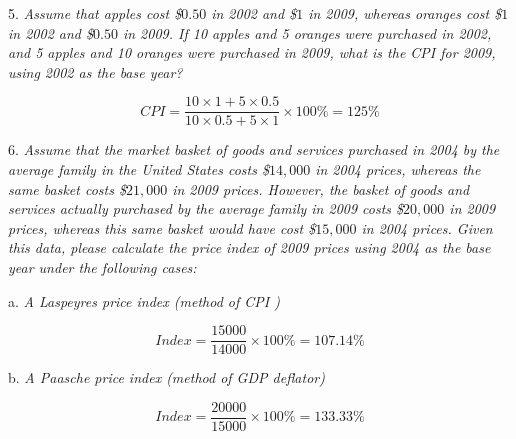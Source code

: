 \documentclass[10pt, a4paper]{article}
\begin{document}
    5. \emph{Assume that apples cost \$$0.50$ in 2002 and \$$1$ in 2009, whereas oranges cost \$$1$ in
    2002 and \$$0.50$ in 2009. If 10 apples and 5 oranges were purchased in 2002, and 5 apples and 10
    oranges were purchased in 2009, what is the CPI for 2009, using 2002 as the base year?}

    $$CPI = \frac{10 \times 1 + 5 \times 0.5}{10 \times 0.5 + 5 \times 1} \times 100\% = 125\%$$\newline

    6. \emph{Assume that the market basket of goods and services purchased in 2004 by the
    average family in the United States costs \$$14,000$ in 2004 prices, whereas the same basket
    costs \$$21,000$ in 2009 prices. However, the basket of goods and services actually purchased
    by the average family in 2009 costs \$$20,000$ in 2009 prices, whereas this same basket would
    have cost \$$15,000$ in 2004 prices. Given this data, please calculate the price index of 2009
    prices using 2004 as the base year under the following cases:}
    
    a. \emph{A Laspeyres price index (method of CPI )}

        $$Index = \frac{15000}{14000} \times 100\% = 107.14\% $$\newline

    b. \emph{A Paasche price index (method of GDP deflator)}

        $$Index = \frac{20000}{15000} \times 100\% = 133.33\% $$
\end{document}
